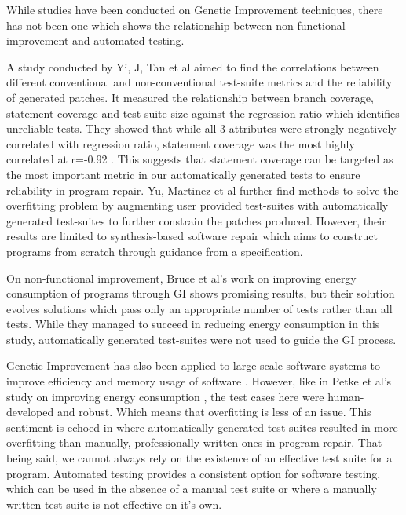 \documentclass[titlepage]{article}
\begin{document}
While studies have been conducted on Genetic Improvement techniques, there has not been one which shows the relationship between non-functional improvement and automated testing.

A study conducted by Yi, J, Tan et al \cite{yicorrelation} aimed to find the correlations between different conventional and non-conventional test-suite metrics and the reliability of generated patches. It measured the relationship between branch coverage, statement coverage and test-suite size against the regression ratio which identifies unreliable tests. They showed that while all 3 attributes were strongly negatively correlated with regression ratio, statement coverage was the most highly correlated at r=-0.92 . This suggests that statement coverage can be targeted as the most important metric in our automatically generated tests to ensure reliability in program repair.
Yu, Martinez et al \cite{yumartinez2019} further find methods to solve the overfitting problem by augmenting user provided test-suites with automatically generated test-suites to further constrain the patches produced. However, their results are limited to synthesis-based software repair which aims to construct programs from scratch through guidance from a specification.

On non-functional improvement, Bruce et al’s \cite{bruceenergy} work on improving energy consumption of programs through GI shows promising results, but their solution evolves solutions which pass only an appropriate number of tests rather than all tests. While they managed to succeed in reducing energy consumption in this study, automatically generated test-suites were not used to guide the GI process.

Genetic Improvement has also been applied to large-scale software systems to improve efficiency and memory usage of software \cite{yuewu2015}. However, like in Petke et al's study on improving energy consumption \cite{bruceenergy}, the test cases here were human-developed and robust. Which means that overfitting is less of an issue. This sentiment is echoed in \cite{cure} where automatically generated test-suites resulted in more overfitting than manually, professionally written ones in program repair.  That being said, we cannot always rely on the existence of an effective test suite for a program. Automated testing provides a consistent option for software testing, which can be used in the absence of a manual test suite or where a manually written test suite is not effective on it's own.
\end{document}
